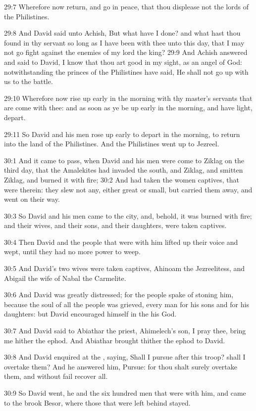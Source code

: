 29:7 Wherefore now return, and go in peace, that thou displease not
the lords of the Philistines.

29:8 And David said unto Achish, But what have I done? and what hast
thou found in thy servant so long as I have been with thee unto this
day, that I may not go fight against the enemies of my lord the king?
29:9 And Achish answered and said to David, I know that thou art good
in my sight, as an angel of God: notwithstanding the princes of the
Philistines have said, He shall not go up with us to the battle.

29:10 Wherefore now rise up early in the morning with thy master's
servants that are come with thee: and as soon as ye be up early in the
morning, and have light, depart.

29:11 So David and his men rose up early to depart in the morning, to
return into the land of the Philistines. And the Philistines went up
to Jezreel.

30:1 And it came to pass, when David and his men were come to Ziklag
on the third day, that the Amalekites had invaded the south, and
Ziklag, and smitten Ziklag, and burned it with fire; 30:2 And had
taken the women captives, that were therein: they slew not any, either
great or small, but carried them away, and went on their way.

30:3 So David and his men came to the city, and, behold, it was burned
with fire; and their wives, and their sons, and their daughters, were
taken captives.

30:4 Then David and the people that were with him lifted up their
voice and wept, until they had no more power to weep.

30:5 And David's two wives were taken captives, Ahinoam the
Jezreelitess, and Abigail the wife of Nabal the Carmelite.

30:6 And David was greatly distressed; for the people spake of stoning
him, because the soul of all the people was grieved, every man for his
sons and for his daughters: but David encouraged himself in the \LORD
his God.

30:7 And David said to Abiathar the priest, Ahimelech's son, I pray
thee, bring me hither the ephod. And Abiathar brought thither the
ephod to David.

30:8 And David enquired at the \LORD, saying, Shall I pursue after this
troop? shall I overtake them? And he answered him, Pursue: for thou
shalt surely overtake them, and without fail recover all.

30:9 So David went, he and the six hundred men that were with him, and
came to the brook Besor, where those that were left behind stayed.

